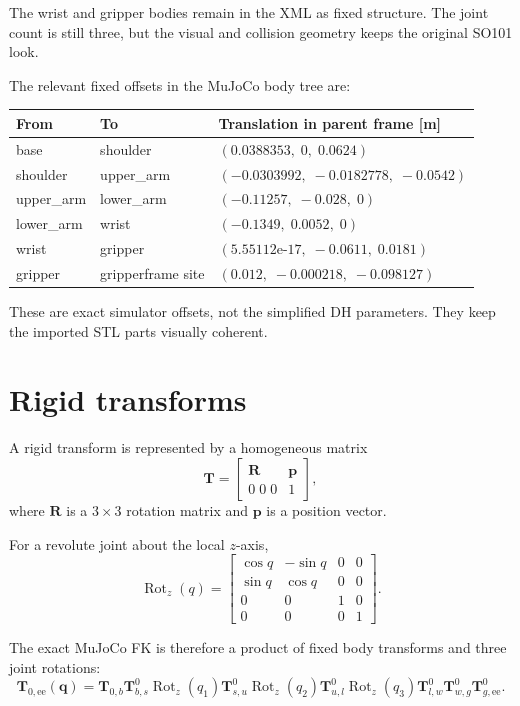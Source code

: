 \documentclass[11pt]{article}
\newcommand{\T}{\mathbf{T}}
\newcommand{\R}{\mathbf{R}}
\newcommand{\p}{\mathbf{p}}
\newcommand{\q}{\mathbf{q}}
\newcommand{\Rotz}{\operatorname{Rot}_z}
\begin{document}
The wrist and gripper bodies remain in the XML as fixed structure. The joint
count is still three, but the visual and collision geometry keeps the original
SO101 look.

The relevant fixed offsets in the MuJoCo body tree are:
\begin{center}
\begin{tabular}{@{}lll@{}}
\toprule
From & To & Translation in parent frame [m] \\
\midrule
base & shoulder & \((0.0388353,\;0,\;0.0624)\) \\
shoulder & upper\_arm & \((-0.0303992,\;-0.0182778,\;-0.0542)\) \\
upper\_arm & lower\_arm & \((-0.11257,\;-0.028,\;0)\) \\
lower\_arm & wrist & \((-0.1349,\;0.0052,\;0)\) \\
wrist & gripper & \((5.55112\text{e-}17,\;-0.0611,\;0.0181)\) \\
gripper & gripperframe site & \((0.012,\;-0.000218,\;-0.098127)\) \\
\bottomrule
\end{tabular}
\end{center}

These are exact simulator offsets, not the simplified DH parameters. They keep
the imported STL parts visually coherent.

\section{Rigid transforms}
A rigid transform is represented by a homogeneous matrix
\[
\T =
\begin{bmatrix}
\R & \p \\
0\;0\;0 & 1
\end{bmatrix},
\]
where \(\R\) is a \(3 \times 3\) rotation matrix and \(\p\) is a position vector.

For a revolute joint about the local \(z\)-axis,
\[
\Rotz(q) =
\begin{bmatrix}
\cos q & -\sin q & 0 & 0 \\
\sin q & \cos q & 0 & 0 \\
0 & 0 & 1 & 0 \\
0 & 0 & 0 & 1
\end{bmatrix}.
\]

The exact MuJoCo FK is therefore a product of fixed body transforms and three
joint rotations:
\[
\T_{0,\mathrm{ee}}(\q)
=
\T_{0,b}
\T_{b,s}^{0}\Rotz(q_1)
\T_{s,u}^{0}\Rotz(q_2)
\T_{u,l}^{0}\Rotz(q_3)
\T_{l,w}^{0}
\T_{w,g}^{0}
\T_{g,\mathrm{ee}}^{0}.
\]
\end{document}
